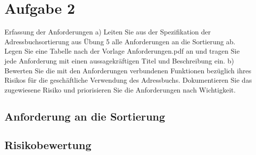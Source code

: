 \section*{Aufgabe 2}

Erfassung der Anforderungen
a) Leiten Sie aus der Spezifikation der Adressbuchsortierung aus Übung 5 alle Anforderungen an die Sortierung ab. Legen Sie eine Tabelle nach der Vorlage Anforderungen.pdf an und tragen Sie jede Anforderung mit einen aussagekräftigen Titel und Beschreibung ein.
b) Bewerten Sie die mit den Anforderungen verbundenen Funktionen bezüglich ihres Risikos für die geschäftliche Verwendung des Adressbuchs. Dokumentieren Sie das zugewiesene Risiko und priorisieren Sie die Anforderungen nach Wichtigkeit.
\subsection*{Anforderung an die Sortierung}

\subsection*{Risikobewertung}
